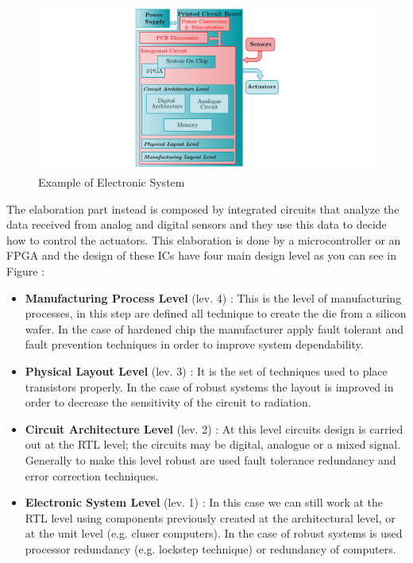 {{{			\begin{figure}[H]
				\centering
				\includegraphics[scale=0.26,center]{./images/ElectronicSystemParts.png}
				\caption{Example of Electronic System}
				\label{fig:ElectronicSystemParts}
			\end{figure} 
			
			The elaboration part instead is composed by integrated circuits that analyze the data received from analog and digital sensors and they use this data to decide how to control the actuators. This elaboration is done by a microcontroller or an FPGA and the design of these ICs have four main design level  as you can see in Figure :
			\begin{itemize}
				\item \textbf{Manufacturing Process Level } (lev. 4) : This is the level of manufacturing processes, in this step are defined all technique to create the die from a silicon wafer. In the case of hardened chip the manufacturer apply fault tolerant and fault prevention techniques in order to improve system dependability. 
				\item \textbf{Physical Layout Level} (lev. 3) : It is the set of techniques used to place transistors properly. In the case of robust systems the layout is improved in order to decrease the sensitivity of the circuit to radiation.
				\item \textbf{Circuit Architecture Level } (lev. 2) : At this level circuits design is carried out at the RTL level; the circuits may be digital, analogue or a mixed signal. Generally to make this level robust are used fault tolerance redundancy and error correction techniques.   
				\item \textbf{Electronic System Level } (lev. 1) : In this case we can still work at the RTL level using components previously created at the architectural level, or at the unit level (e.g. cluser computers). In the case of robust systems is used processor redundancy (e.g. lockstep technique) or redundancy of computers.
			\end{itemize}  
		
}}}
